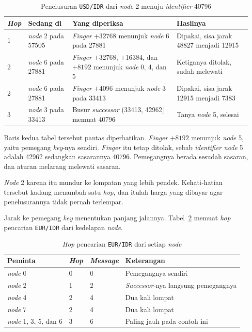 \begin{table}[htbp]
  \centering
  \caption{Penelusuran \texttt{USD/IDR} dari \textit{node} 2 menuju \textit{identifier} 40796}
  \label{tab:cari-usd}
  \begin{tabularx}{\textwidth}{|l|l|X|l|}
    \hline
    \textbf{\textit{Hop}} & \textbf{Sedang di} & \textbf{Yang diperiksa} & \textbf{Hasilnya} \\
    \hline
    1 & \textit{node} 2 pada 57505 & \textit{Finger} $+32768$ menunjuk \textit{node} 6 pada 27881 & Dipakai, sisa jarak 48827 menjadi 12915 \\
    \hline
    2 & \textit{node} 6 pada 27881 & \textit{Finger} $+32768$, $+16384$, dan $+8192$ menunjuk \textit{node} 0, 4, dan 5 & Ketiganya ditolak, sudah melewati \\
    \hline
    2 & \textit{node} 6 pada 27881 & \textit{Finger} $+4096$ menunjuk \textit{node} 3 pada 33413 & Dipakai, sisa jarak 12915 menjadi 7383 \\
    \hline
    3 & \textit{node} 3 pada 33413 & Busur \textit{successor} (33413, 42962] memuat 40796 & Tanya \textit{node} 5, selesai \\
    \hline
  \end{tabularx}
\end{table}

Baris kedua tabel tersebut pantas diperhatikan. \textit{Finger} $+8192$ menunjuk
\textit{node} 5, yaitu pemegang \textit{key}-nya sendiri. \textit{Finger} itu tetap ditolak, sebab
\textit{identifier node} 5 adalah 42962 sedangkan sasarannya 40796. Pemegangnya
berada sesudah sasaran, dan aturan melarang melewati sasaran.

\textit{Node} 2 karena itu mundur ke lompatan yang lebih pendek. Kehati-hatian
tersebut kadang menambah satu \textit{hop}, dan itulah harga yang dibayar agar
penelusurannya tidak pernah terlempar.

Jarak ke pemegang \textit{key} menentukan panjang jalannya.
Tabel~\ref{tab:hop-semua} memuat \textit{hop} pencarian \texttt{EUR/IDR} dari
kedelapan \textit{node}.

\begin{table}[htbp]
  \centering
  \caption{\textit{Hop} pencarian \texttt{EUR/IDR} dari setiap \textit{node}}
  \label{tab:hop-semua}
  \begin{tabularx}{\textwidth}{|l|l|l|X|}
    \hline
    \textbf{Peminta} & \textbf{\textit{Hop}} & \textbf{\textit{Message}} & \textbf{Keterangan} \\
    \hline
    \textit{node} 0 & 0 & 0 & Pemegangnya sendiri \\
    \hline
    \textit{node} 2 & 1 & 2 & \textit{Successor}-nya langsung pemegangnya \\
    \hline
    \textit{node} 4 & 2 & 4 & Dua kali lompat \\
    \hline
    \textit{node} 7 & 2 & 4 & Dua kali lompat \\
    \hline
    \textit{node} 1, 3, 5, dan 6 & 3 & 6 & Paling jauh pada contoh ini \\
    \hline
  \end{tabularx}
\end{table}

